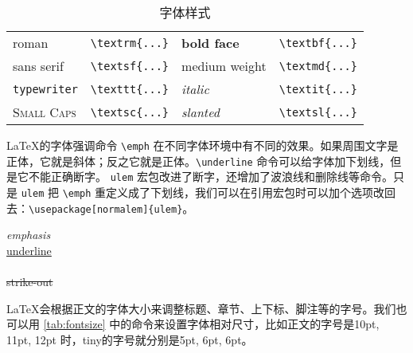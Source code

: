 \begin{table}[htbp]
\centering
\caption{字体样式}
\label{tab:font_style}
\begin{tabular}{llll}
  \toprule
  \textrm{roman} & \verb|\textrm{...}| & 
    \textbf{bold face} & \verb|\textbf{...}| \\
  \textsf{sans serif} & \verb|\textsf{...}| & 
    \textmd{medium weight} & \verb|\textmd{...}| \\
  \texttt{typewriter} & \verb|\texttt{...}| & 
    \textit{italic} & \verb|\textit{...}| \\
  \textsc{Small Caps} & \verb|\textsc{...}| & 
    \textsl{slanted} & \verb|\textsl{...}| \\
  \bottomrule
\end{tabular}
\end{table}

\LaTeX 的字体强调命令 \verb|\emph| 在不同字体环境中有不同的效果。如果周围文字是正体，它就是斜体；反之它就是正体。\verb|\underline| 命令可以给字体加下划线，但是它不能正确断字。 \texttt{ulem} 宏包改进了断字，还增加了波浪线和删除线等命令。只是 \texttt{ulem} 把 \verb|\emph| 重定义成了下划线，我们可以在引用宏包时可以加个选项改回去：\verb|\usepackage[normalem]{ulem}|。

\begin{example}[htbp]
\begin{RLDemo}[]
\emph{emphasis}\\
\uline{underline}\\
\\
\sout{strike-out}
\end{RLDemo}
\caption{字体强调和下划线}
\end{example}

\LaTeX 会根据正文的字体大小来调整标题、章节、上下标、脚注等的字号。我们也可以用 \autoref{tab:fontsize} 中的命令来设置字体相对尺寸，比如正文的字号是10pt, 11pt, 12pt 时，tiny的字号就分别是5pt, 6pt, 6pt。


